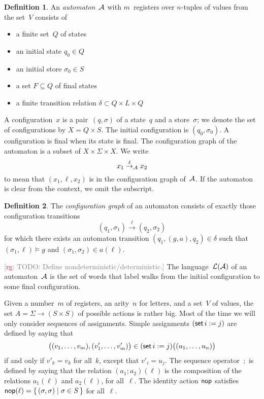 \documentclass[9pt, preprint]{sigplanconf} %
\newcommand{\noterg}[2]{\textcolor{gray}{[\textcolor{red}{#1}: #2]}}
\newcommand{\rg}[1]{\noterg{rg}{#1}}
\theoremstyle{definition}
\newtheorem{definition}{Definition}
\theoremstyle{remark}
\begin{document}
\begin{definition}\label{def:automaton}
An \emph{automaton}~${\cal A}$ with $m$~registers over $n$-tuples of values from the set~$V$ consists of
\begin{itemize}
\item a finite set~$Q$ of states
\item an initial state $q_0\in Q$
\item an initial store $\sigma_0\in S$
\item a set $F\subseteq Q$ of final states
\item a finite transition relation $\delta\subset Q\times L\times Q$
\end{itemize}
\end{definition}

A configuration~$x$ is a pair~$(q,\sigma)$ of a state~$q$ and a store~$\sigma$;
we denote the set of configurations by $X=Q\times S$.
The initial configuration is $(q_0,\sigma_0)$.
A configuration is final when its state is final.
The configuration graph of the automaton is a subset of $X\times\Sigma\times X$.
We write \[x_1\stackrel{\ell}{\to}_{\cal A}x_2\] to mean that $(x_1,\ell,x_2)$ is in the configuration graph of~${\cal A}$.
If the automaton is clear from the context, we omit the subscript.

\begin{definition}\label{def:cgraph}
The \emph{configuration graph} of an automaton consists of exactly those configuration transitions \[ (q_1,\sigma_1) \stackrel{\ell}{\to} (q_2,\sigma_2) \] for which there exists an automaton transition $(q_1,(g,a),q_2)\in\delta$ such that $(\sigma_1,\ell)\models g$ and $(\sigma_1,\sigma_2)\in a(\ell)$.
\end{definition}

\rg{TODO: Define nondeterministic\slash deterministic.}
The language~${\cal L}({\cal A})$ of an automaton~${\cal A}$ is the set of words that label walks from the initial configuration to some final configuration.

\smallskip

Given a number~$m$ of registers, an arity~$n$ for letters, and a set~$V$ of values, the set $A=\Sigma\to(S\times S)$ of possible actions is rather big.
Most of the time we will only consider sequences of assignments.
Simple assignments $({\sf set}\,i:=j)$ are defined by saying that
\[ \bigl((v_1,\ldots,v_m),(v'_1,\ldots,v'_m)\bigr)\in
  ({\sf set}\,i:=j)\bigl((u_1,\ldots,u_n)\bigr) \]
if and only if $v'_k=v_k$ for all~$k$, except that $v'_i=u_j$.
The sequence operator~$;$ is defined by saying that the relation $(a_1;a_2)(\ell)$ is the composition of the relations $a_1(\ell)$ and $a_2(\ell)$, for all~$\ell$.
The identity action ${\sf nop}$ satisfies ${\sf nop}(\ell)=\{\,(\sigma,\sigma)\mid\sigma\in S\,\}$ for all~$\ell$.
\end{document}
